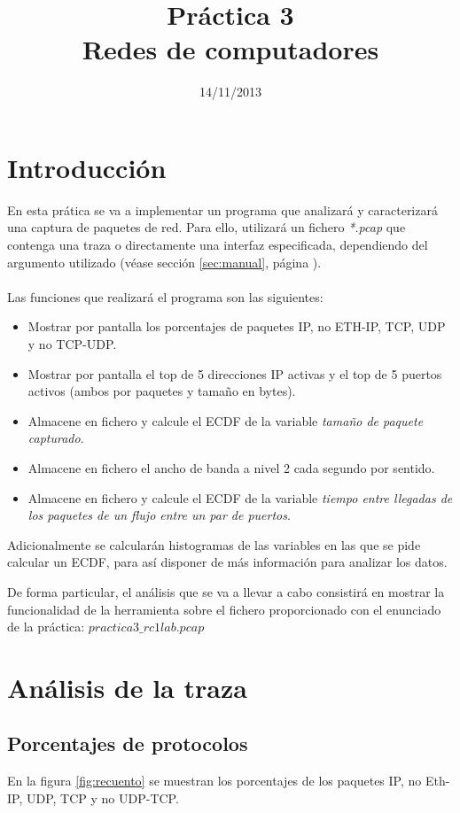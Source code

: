 \documentclass[a4paper, 11pt]{article}	%
\title{Práctica 3\\Redes de computadores}						%
\author{\enriquename \and \guillermoname}						%
\date{14/11/2013}												%
\begin{document}
\maketitle			%
\newpage				%
\tableofcontents		%
\newpage				%

\section{Introducción}	%
En esta prática se va a implementar un programa que analizará y caracterizará una captura de paquetes de red. Para ello, utilizará un fichero \textit{*.pcap} que contenga una traza o directamente una interfaz especificada, dependiendo del argumento utilizado (véase sección \ref{sec:manual}, página \pageref{sec:manual}).
\\\\
Las funciones que realizará el programa son las siguientes:
\begin{itemize}
\item Mostrar por pantalla los porcentajes de paquetes IP, no ETH-IP, TCP, UDP y no TCP-UDP.
\item Mostrar por pantalla el top de 5 direcciones IP activas y el top de 5 puertos activos  (ambos por paquetes y tamaño en bytes).
\item Almacene en fichero y calcule el ECDF de la variable \textit{tamaño de paquete capturado}.
\item Almacene en fichero el ancho de banda a nivel 2 cada segundo por sentido.
\item Almacene en fichero y calcule el ECDF de la variable \textit{tiempo entre llegadas de los paquetes de un flujo entre un par de puertos}.
\end{itemize}

Adicionalmente se calcularán histogramas de las variables en las que se pide calcular un ECDF, para así disponer de más información para analizar los datos.

De forma particular, el análisis que se va a llevar a cabo consistirá en mostrar la funcionalidad de la herramienta sobre el fichero proporcionado con el enunciado de la práctica: \textit{$practica3\_ rc1lab.pcap$}

\section{Análisis de la traza}
\subsection{Porcentajes de protocolos}
En la figura \ref{fig:recuento} se muestran los porcentajes de los paquetes IP, no Eth-IP, UDP, TCP y no UDP-TCP.
\end{document}
